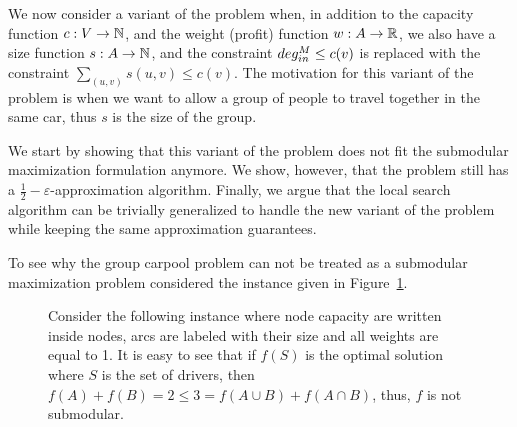 We now consider a variant of the problem when, in addition to the capacity
function $c:V \to \N$, and the weight (profit) function $w:A \to \R$, we also
have a size function $s:A \to \N$, and the constraint $\din[M] \leq c(v)$
is replaced with the constraint $\sum_{(u,v)}s(u,v) \leq c(v)$.
The motivation for this variant of the problem is when we want to allow a group
of people to travel together in the same car, thus $s$ is the size of the group.

We start by showing that this variant of the problem does not
fit the submodular maximization formulation anymore.
We show, however, that the problem still has a 
$\frac{1}{2} - \varepsilon$-approximation algorithm.
Finally, we argue that the local search algorithm can be trivially generalized
to handle the new variant of the problem while keeping the same approximation
guarantees.

To see why the group carpool problem can not be treated as a
submodular maximization problem considered the instance given in
Figure~\ref{fig:not submodular}.

\begin{figure}
\caption{
\label{fig:not submodular}
Consider the following instance where node capacity are written inside nodes, 
arcs are labeled with their size and all weights are equal to 1.
It is easy to see that if $f(S)$ is the optimal solution where $S$ is the set of
drivers, then $f(A) + f(B) = 2 \leq 3 = f(A \cup B) + f(A \cap B)$,
thus, $f$ is not submodular. 
}
\begin{center}

\end{center}
\end{figure}
